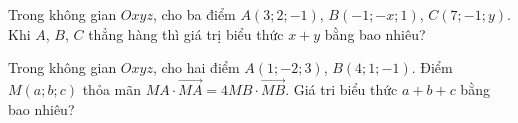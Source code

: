 \begin{bt}%
	Trong không gian $Oxyz$, cho ba điểm $A(3;2;-1)$, $B(-1;-x;1)$, $C(7;-1;y)$.  Khi $A$, $B$, $C$ thẳng hàng thì giá trị biểu thức $x+y$ bằng bao nhiêu?
\end{bt}

\begin{bt}%
	Trong không gian $Oxyz$, cho hai điểm $A(1;-2;3)$, $B(4;1;-1)$. Điểm $M(a;b;c)$ thỏa mãn $MA \cdot \overrightarrow{MA}=4MB\cdot \overrightarrow{MB}$. Giá tri biểu thức $a+b+c$  bằng bao nhiêu?
\end{bt}

